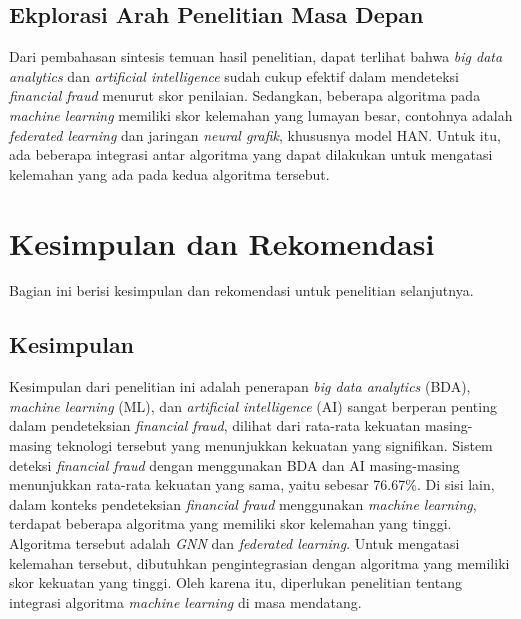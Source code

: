 \documentclass[12pt, a4paper]{article}
\begin{document}
\subsection*{Ekplorasi Arah Penelitian Masa Depan}
\hspace{1cm}Dari pembahasan sintesis temuan hasil penelitian, dapat terlihat bahwa \textit{big data analytics} dan \textit{artificial intelligence} sudah cukup efektif dalam mendeteksi \textit{financial fraud} menurut skor penilaian. 
Sedangkan, beberapa algoritma pada \textit{machine learning} memiliki skor kelemahan yang lumayan besar, contohnya adalah \textit{federated learning} dan jaringan \textit{neural grafik}, khususnya model HAN. Untuk itu, ada beberapa integrasi antar algoritma yang dapat dilakukan untuk mengatasi kelemahan yang ada pada kedua algoritma tersebut.

\section*{Kesimpulan dan Rekomendasi}
\hspace{1cm}Bagian ini berisi kesimpulan dan rekomendasi untuk penelitian selanjutnya.

\subsection*{Kesimpulan}
\hspace{1cm}Kesimpulan dari penelitian ini adalah penerapan \textit{big data analytics} (BDA), \textit{machine learning} (ML), dan \textit{artificial intelligence} (AI) sangat berperan penting dalam pendeteksian \textit{financial fraud}, 
dilihat dari rata-rata kekuatan masing-masing teknologi tersebut yang menunjukkan kekuatan yang signifikan. 
Sistem deteksi \textit{financial fraud} dengan menggunakan BDA dan AI masing-masing menunjukkan rata-rata kekuatan yang sama, yaitu sebesar 76.67\%. Di sisi lain, dalam konteks pendeteksian \textit{financial fraud} menggunakan \textit{machine learning}, terdapat beberapa algoritma yang memiliki skor kelemahan yang tinggi. 
Algoritma tersebut adalah \textit{GNN} dan \textit{federated learning}. 
Untuk mengatasi kelemahan tersebut, dibutuhkan pengintegrasian dengan algoritma yang memiliki skor kekuatan yang tinggi. Oleh karena itu, diperlukan penelitian tentang integrasi algoritma \textit{machine learning} di masa mendatang.
\end{document}
